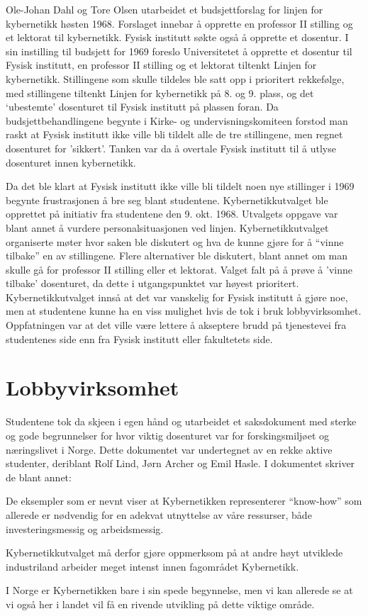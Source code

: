 \documentclass[../../main.tex]{subfiles}
\begin{document}
Ole-Johan Dahl og Tore Olsen utarbeidet et budsjettforslag for linjen for kybernetikk høsten 1968. Forslaget innebar å opprette en professor II stilling og et lektorat til kybernetikk. Fysisk institutt søkte også å opprette et dosentur. I sin instilling til budsjett for 1969 foreslo Universitetet å opprette et dosentur til Fysisk institutt, en professor II stilling og et lektorat tiltenkt Linjen for kybernetikk. Stillingene som skulle tildeles ble satt opp i prioritert rekkefølge, med stillingene tiltenkt Linjen for kybernetikk på 8. og 9. plass, og det `ubestemte' dosenturet til Fysisk institutt på plassen foran. Da budsjettbehandlingene begynte i Kirke- og undervisningskomiteen forstod man raskt at Fysisk institutt ikke ville bli tildelt alle de tre stillingene, men regnet dosenturet for 'sikkert'. Tanken var da å overtale Fysisk institutt til å utlyse dosenturet innen kybernetikk.

Da det ble klart at Fysisk institutt ikke ville bli tildelt noen nye stillinger i 1969 begynte frustrasjonen å bre seg blant studentene. Kybernetikkutvalget ble opprettet på initiativ fra studentene den 9. okt. 1968. Utvalgets oppgave var blant annet å vurdere personalsituasjonen ved linjen. Kybernetikkutvalget organiserte møter hvor saken ble diskutert og hva de kunne gjøre for å ``vinne tilbake'' en av stillingene. Flere alternativer ble diskutert, blant annet om man skulle gå for professor II stilling eller et lektorat. Valget falt på å prøve å 'vinne tilbake' dosenturet, da dette i utgangspunktet var høyest prioritert. Kybernetikkutvalget innså at det var vanskelig for Fysisk institutt å gjøre noe, men at studentene kunne ha en viss mulighet hvis de tok i bruk lobbyvirksomhet. Oppfatningen var at det ville være lettere å akseptere brudd på tjenestevei fra studentenes side enn fra Fysisk institutt eller fakultetets side.

\section{Lobbyvirksomhet}

Studentene tok da skjeen i egen hånd og utarbeidet et saksdokument med sterke og gode begrunnelser for hvor viktig dosenturet var for forskingsmiljøet og næringslivet i Norge. Dette dokumentet var undertegnet av en rekke aktive studenter, deriblant Rolf Lind, Jørn Archer og Emil Hasle. I dokumentet skriver de blant annet:

\begin{displayquote}
	De eksempler som er nevnt viser at Kybernetikken representerer ``know-how'' som allerede er nødvendig for en adekvat utnyttelse av våre ressurser, både investeringsmessig og arbeidsmessig.

	Kybernetikkutvalget må derfor gjøre oppmerksom på at andre høyt utviklede industriland arbeider meget intenst innen fagområdet Kybernetikk.

	I Norge er Kybernetikken bare i sin spede begynnelse, men vi kan allerede se at vi også her i landet vil få en rivende utvikling på dette viktige område.
\end{displayquote}
\end{document}
